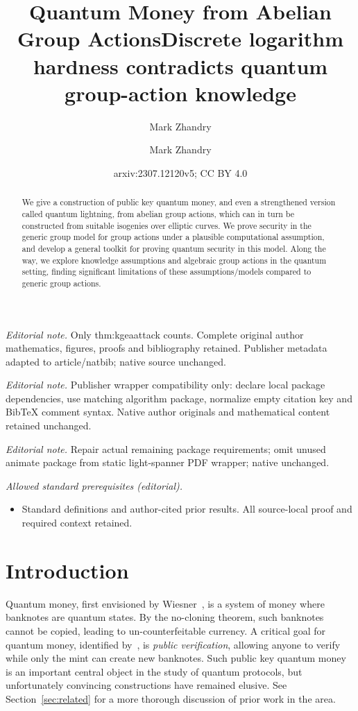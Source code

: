 \documentclass{article}\usepackage[a4paper,margin=20mm]{geometry}
\title{Quantum Money from Abelian Group Actions}
\author{Mark Zhandry}\date{}
\title{Discrete logarithm hardness contradicts quantum group-action knowledge}
\author{Mark Zhandry}
\date{arxiv:2307.12120v5; CC BY 4.0}
\numberwithin{theorem}{section}
\numberwithin{equation}{section}
\begin{document}
\maketitle
\noindent\textit{Editorial note.} Only thm:kgeaattack counts. Complete original author mathematics, figures, proofs and bibliography retained. Publisher metadata adapted to article/natbib; native source unchanged.\par\medskip
\noindent\textit{Editorial note.} Publisher wrapper compatibility only: declare local package dependencies, use matching algorithm package, normalize empty citation key and BibTeX comment syntax. Native author originals and mathematical content retained unchanged.\par\medskip
\noindent\textit{Editorial note.} Repair actual remaining package requirements; omit unused animate package from static light-spanner PDF wrapper; native unchanged.\par\medskip
\noindent\textit{Allowed standard prerequisites (editorial).}\begin{itemize}
\item Standard definitions and author-cited prior results. All source-local proof and required context retained.
\end{itemize}\medskip

\maketitle

\begin{abstract}We give a construction of public key quantum money, and even a strengthened version called quantum lightning, from abelian group actions, which can in turn be constructed from suitable isogenies over elliptic curves. We prove security in the generic group model for group actions under a plausible computational assumption, and develop a general toolkit for proving quantum security in this model. Along the way, we explore knowledge assumptions and algebraic group actions in the quantum setting, finding significant limitations of these assumptions/models compared to generic group actions. 
\end{abstract}
	


\section{Introduction}\label{sec:intro}

Quantum money, first envisioned by Wiesner~\cite{Wiesner83}, is a system of money where banknotes are quantum states. By the no-cloning theorem, such banknotes cannot be copied, leading to un-counterfeitable currency. A critical goal for quantum money, identified by~\cite{CCC:Aaronson09}, is \emph{public verification}, allowing anyone to verify while only the mint can create new banknotes. Such public key quantum money is an important central object in the study of quantum protocols, but unfortunately convincing constructions have remained elusive. See Section~\ref{sec:related} for a more thorough discussion of prior work in the area.
\end{document}
